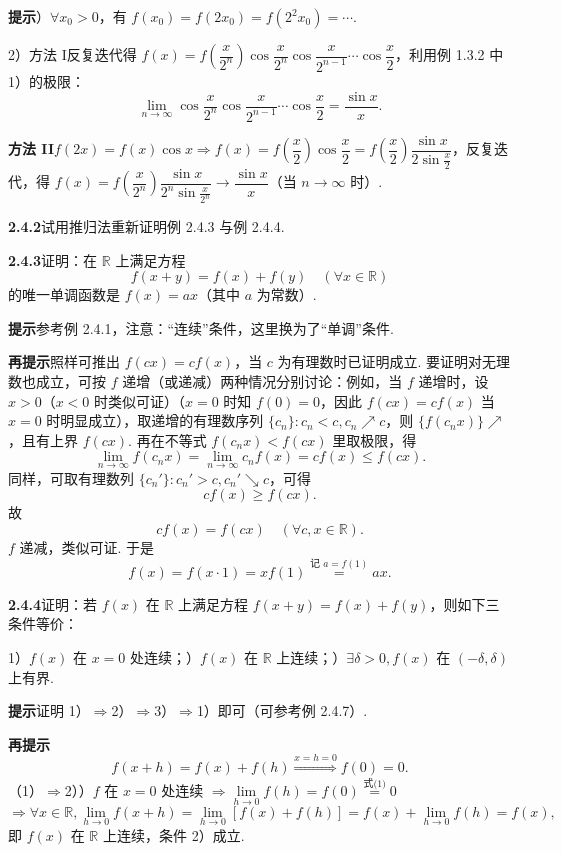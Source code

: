 \documentclass[UTF8, 12pt, fontset=fandol, oneside]{ctexart}
\begin{document}
\noindent\textbf{提示}）$\forall x_0>0$，有 $f(x_0)=f(2x_0)=f(2^2x_0)=\cdots$.

2）方法 I\quad 反复迭代得 $f(x)=f\left(\dfrac{x}{2^n}\right)\cos\dfrac{x}{2^n}\cos\dfrac{x}{2^{n-1}}\cdots\cos\dfrac x2$，利用例 1.3.2 中 1）的极限：
\[
  \lim_{n\to\infty}\cos\frac{x}{2^n}\cos\frac{x}{2^{n-1}}\cdots\cos\frac x2=\frac{\sin x}{x}.
\]

\noindent\textbf{方法 II}\quad $f(2x)=f(x)\cos x\Rightarrow f(x)=f\left(\dfrac x2\right)\cos\dfrac x2=f\left(\dfrac x2\right)\dfrac{\sin x}{2\sin\frac x2}$，反复迭代，得 $f(x)=f\left(\dfrac{x}{2^n}\right)\dfrac{\sin x}{2^n\sin\frac{x}{2^n}}\to\dfrac{\sin x}{x}$（当 $n\to\infty$ 时）.

\noindent\textbf{2.4.2}\quad 试用推归法重新证明例 2.4.3 与例 2.4.4.

\noindent\textbf{2.4.3}\quad 证明：在 $\mathbb{R}$ 上满足方程
\[
  f(x+y)=f(x)+f(y)\quad(\forall x\in\mathbb{R})
\]
的唯一单调函数是 $f(x)=ax$（其中 $a$ 为常数）.

\noindent\textbf{提示}\quad 参考例 2.4.1，注意：“连续”条件，这里换为了“单调”条件.

\noindent\textbf{再提示}\quad 照样可推出 $f(cx)=cf(x)$，当 $c$ 为有理数时已证明成立. 要证明对无理数也成立，可按 $f$ 递增（或递减）两种情况分别讨论：例如，当 $f$ 递增时，设 $x>0$（$x<0$ 时类似可证）（$x=0$ 时知 $f(0)=0$，因此 $f(cx)=cf(x)$ 当 $x=0$ 时明显成立），取递增的有理数序列 $\{c_n\}:c_n<c,c_n\nearrow c$，则 $\{f(c_nx)\}\nearrow$，且有上界 $f(cx)$. 再在不等式 $f(c_nx)<f(cx)$ 里取极限，得
\[
  \lim_{n\to\infty}f(c_nx)=\lim_{n\to\infty}c_nf(x)=cf(x)\le f(cx). \tag{1}
\]
同样，可取有理数列 $\{c_n'\}:c_n'>c,c_n'\searrow c$，可得
\[
  cf(x)\ge f(cx). \tag{2}
\]
故
\[
  cf(x)=f(cx)\quad(\forall c,x\in\mathbb{R}).
\]
$f$ 递减，类似可证. 于是
\[
  f(x)=f(x\cdot1)=xf(1)\overset{\text{记 }a=f(1)}{=}ax.
\]

\noindent\textbf{2.4.4}\quad 证明：若 $f(x)$ 在 $\mathbb{R}$ 上满足方程 $f(x+y)=f(x)+f(y)$，则如下三条件等价：

1）$f(x)$ 在 $x=0$ 处连续；）$f(x)$ 在 $\mathbb{R}$ 上连续；）$\exists\delta>0,f(x)$ 在 $(-\delta,\delta)$ 上有界.

\noindent\textbf{提示}\quad 证明 1）$\Rightarrow$2）$\Rightarrow$3）$\Rightarrow$1）即可（可参考例 2.4.7）.

\noindent\textbf{再提示}\quad
\[
  f(x+h)=f(x)+f(h)\overset{x=h=0}{\Longrightarrow}f(0)=0. \tag{1}
\]
（1）$\Rightarrow$2））$f$ 在 $x=0$ 处连续 $\Rightarrow\lim\limits_{h\to0}f(h)=f(0)\overset{\text{式(1)}}{=}0$
\[
\Rightarrow \forall x\in\mathbb{R},\lim_{h\to0}f(x+h)=\lim_{h\to0}[f(x)+f(h)]=f(x)+\lim_{h\to0}f(h)=f(x),
\]
即 $f(x)$ 在 $\mathbb{R}$ 上连续，条件 2）成立.
\end{document}
